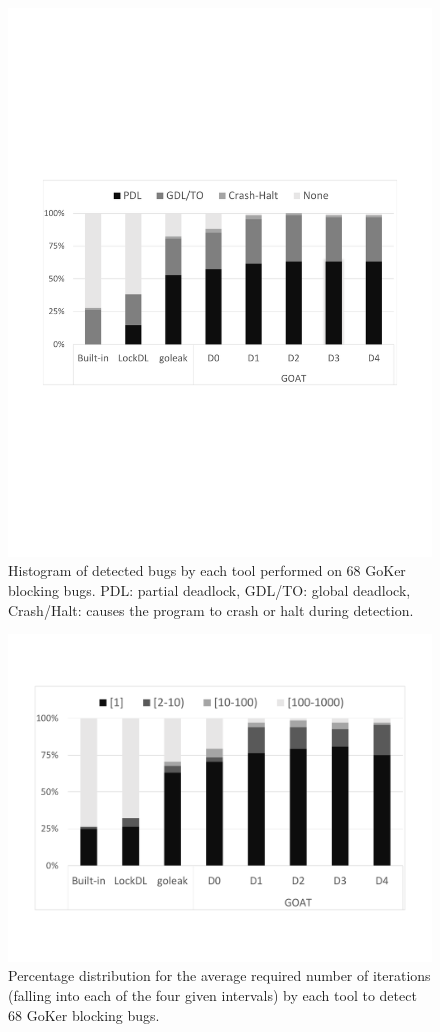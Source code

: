 \begin{figure}
\centering
  \includegraphics[width=.95\linewidth]{figs/P4_detections.pdf}
  \caption{Histogram of detected bugs by each tool performed on 68 GoKer blocking bugs. PDL: partial deadlock, GDL/TO: global deadlock, Crash/Halt: causes the program to crash or halt during detection.}
  \label{fig:detection}
\end{figure}


\begin{figure}
\centering
  \includegraphics[width=.95\linewidth]{figs/P4_runs2.pdf}
  \caption{Percentage distribution for the average required number of iterations (falling into each of the four given intervals) by each tool to detect 68 GoKer blocking bugs.}
  \label{fig:runs}
\end{figure}


